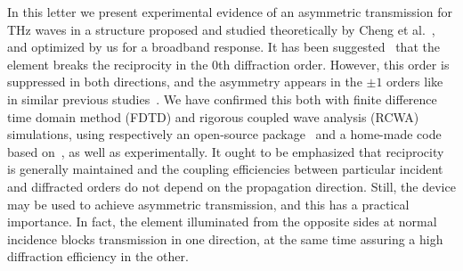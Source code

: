 \documentclass[10pt,letterpaper,twocolumn]{article} %
\begin{document}
In this letter we present experimental evidence of an asymmetric transmission for THz waves in a structure proposed and studied theoretically by Cheng et al.~\cite{13,14,17}, and optimized by us for a broadband response.
  It has been suggested~\cite{17} that the element breaks the reciprocity in the 0th diffraction order. However, this order is suppressed in both directions, and the asymmetry appears in the $\pm1$ orders like in similar previous studies~\cite{2,3}. We have confirmed this both with finite difference time domain method (FDTD) and rigorous coupled wave analysis (RCWA) simulations, using respectively an open-source package~\cite{19} and a home-made code based on~\cite{20}, as well as experimentally. It ought to be emphasized that reciprocity is generally maintained and the coupling efficiencies between particular incident and diffracted orders do not depend on the propagation direction. Still, the device may be used to achieve asymmetric transmission, and this has a practical importance. In fact, the element illuminated from the opposite sides at normal incidence blocks transmission in one direction, at the same time assuring a high diffraction efficiency in the other.
  
  
\end{document}
